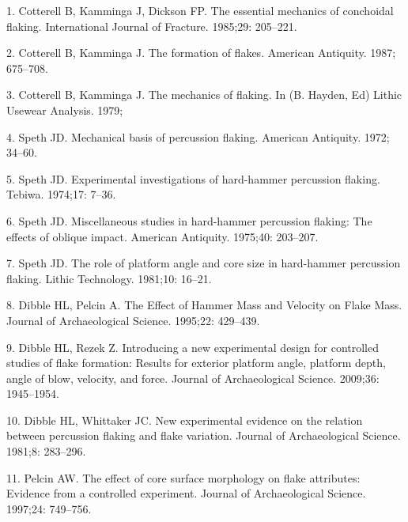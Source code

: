 \documentclass[10pt,letterpaper]{article}
\newenvironment{cslreferences}%
  {}%
  {\par}
\begin{document}
\hypertarget{refs}{}
\begin{cslreferences}
\leavevmode\hypertarget{ref-cotterell_essential_1985}{}%
1. Cotterell B, Kamminga J, Dickson FP. The essential mechanics of
conchoidal flaking. International Journal of Fracture. 1985;29:
205--221.

\leavevmode\hypertarget{ref-cotterell_formation_1987}{}%
2. Cotterell B, Kamminga J. The formation of flakes. American Antiquity.
1987; 675--708.

\leavevmode\hypertarget{ref-cotterell_mechanics_1979}{}%
3. Cotterell B, Kamminga J. The mechanics of flaking. In (B. Hayden, Ed)
Lithic Usewear Analysis. 1979;

\leavevmode\hypertarget{ref-speth_mechanical_1972}{}%
4. Speth JD. Mechanical basis of percussion flaking. American Antiquity.
1972; 34--60.

\leavevmode\hypertarget{ref-speth_experimental_1974}{}%
5. Speth JD. Experimental investigations of hard-hammer percussion
flaking. Tebiwa. 1974;17: 7--36.

\leavevmode\hypertarget{ref-speth_miscellaneous_1975}{}%
6. Speth JD. Miscellaneous studies in hard-hammer percussion flaking:
The effects of oblique impact. American Antiquity. 1975;40: 203--207.

\leavevmode\hypertarget{ref-speth_role_1981}{}%
7. Speth JD. The role of platform angle and core size in hard-hammer
percussion flaking. Lithic Technology. 1981;10: 16--21.

\leavevmode\hypertarget{ref-dibble_effect_1995}{}%
8. Dibble HL, Pelcin A. The Effect of Hammer Mass and Velocity on Flake
Mass. Journal of Archaeological Science. 1995;22: 429--439.

\leavevmode\hypertarget{ref-dibble_introducing_2009-1}{}%
9. Dibble HL, Rezek Z. Introducing a new experimental design for
controlled studies of flake formation: Results for exterior platform
angle, platform depth, angle of blow, velocity, and force. Journal of
Archaeological Science. 2009;36: 1945--1954.

\leavevmode\hypertarget{ref-dibble_new_1981-1}{}%
10. Dibble HL, Whittaker JC. New experimental evidence on the relation
between percussion flaking and flake variation. Journal of
Archaeological Science. 1981;8: 283--296.

\leavevmode\hypertarget{ref-pelcin_effect_1997}{}%
11. Pelcin AW. The effect of core surface morphology on flake
attributes: Evidence from a controlled experiment. Journal of
Archaeological Science. 1997;24: 749--756.


\end{cslreferences}
\end{document}
